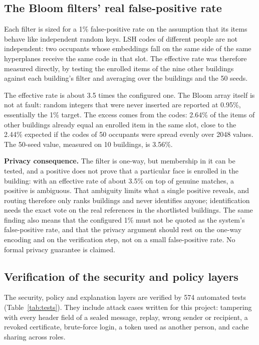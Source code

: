 \documentclass[12pt,a4paper,oneside]{report}
\begin{document}
\subsection{The Bloom filters' real false-positive rate}\label{sec:res-bloom}
Each filter is sized for a 1\% false-positive rate on the assumption that its items behave like independent random keys. LSH codes of different people are not independent: two occupants whose embeddings fall on the same side of the same hyperplanes receive the same code in that slot. The effective rate was therefore measured directly, by testing the enrolled items of the nine other buildings against each building's filter and averaging over the buildings and the 50 seeds.





The effective rate is about 3.5 times the configured one. The Bloom array itself is not at fault: random integers that were never inserted are reported at 0.95\%, essentially the 1\% target. The excess comes from the codes: 2.64\% of the items of other buildings already equal an enrolled item in the same slot, close to the 2.44\% expected if the codes of 50 occupants were spread evenly over 2048 values. The 50-seed value, measured on 10 buildings, is 3.56\%.

\textbf{Privacy consequence.} The filter is one-way, but membership in it can be tested, and a positive does not prove that a particular face is enrolled in the building: with an effective rate of about 3.5\% on top of genuine matches, a positive is ambiguous. That ambiguity limits what a single positive reveals, and routing therefore only ranks buildings and never identifies anyone; identification needs the exact vote on the real references in the shortlisted buildings. The same finding also means that the configured 1\% must not be quoted as the system's false-positive rate, and that the privacy argument should rest on the one-way encoding and on the verification step, not on a small false-positive rate. No formal privacy guarantee is claimed.

\subsection{Verification of the security and policy layers}\label{sec:res-security}
The security, policy and explanation layers are verified by 574 automated tests (Table~\ref{tab:tests}). They include attack cases written for this project: tampering with every header field of a sealed message, replay, wrong sender or recipient, a revoked certificate, brute-force login, a token used as another person, and cache sharing across roles.
\end{document}
